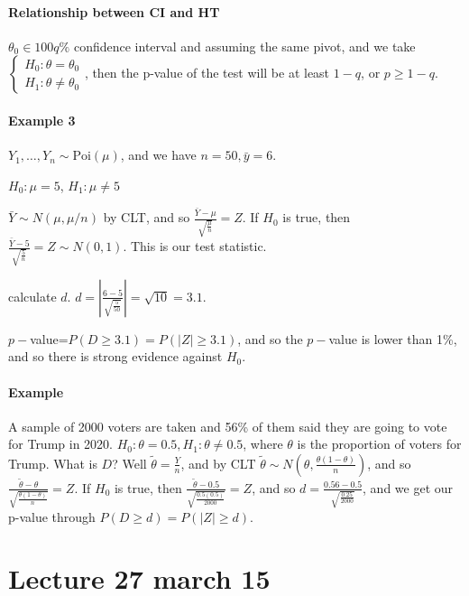 \documentclass[10pt,letter]{article}
\theoremstyle{plain}
\theoremstyle{definition}
\begin{document}
\paragraph{Relationship between CI and HT}
$\theta_0\in100q\%$ confidence interval and assuming the same pivot, and we take $\begin{cases}H_0:\theta=\theta_0\\H_1:\theta\neq\theta_0\end{cases}$, then the p-value of the test will be at least $1-q$, or $p\geq1-q$.

\paragraph{Example 3}
$Y_1,\ldots,Y_n\sim\text{Poi}(\mu)$, and we have $n=50,\bar{y}=6$. 
\begin{steps}
\item $H_0:\mu=5$, $H_1:\mu\neq5$ 
\item $\bar{Y}\sim N(\mu,\mu/n)$ by CLT, and so $\frac{\bar{Y}-\mu}{\sqrt{\frac{\mu}{n}}}=Z$. If $H_0$ is true, then $\frac{\bar{Y}-5}{\sqrt{\frac{5}{n}}}=Z\sim N(0,1)$. This is our test statistic. 
\item calculate $d$. $d=\left|\frac{6-5}{\sqrt{\frac{5}{50}}}\right|=\sqrt{10}=3.1$. 
\item $p-$value=$P(D\geq3.1)=P(|Z|\geq3.1)$, and so the $p-$value is lower than 1\%, and so there is strong evidence against $H_0$. 
\end{steps}

\paragraph{Example}
A sample of 2000 voters are taken and 56\% of them said they are going to vote for Trump in 2020. $H_0:\theta=0.5,H_1:\theta\neq0.5$, where $\theta$ is the proportion of voters for Trump. What is $D$? Well $\tilde\theta=\frac{Y}{n}$, and by CLT $\tilde\theta\sim N(\theta,\frac{\theta(1-\theta)}{n})$, and so $\frac{\tilde\theta-\theta}{\sqrt{\frac{\theta(1-\theta)}{n}}}=Z$. If $H_0$ is true, then $\frac{\tilde\theta-0.5}{\sqrt{\frac{0.5(0.5)}{2000}}}=Z$, and so $d=\frac{0.56-0.5}{\sqrt{\frac{0.25}{2000}}}$, and we get our p-value through $P(D\geq d)=P(|Z|\geq d)$. 


\section*{Lecture 27 march 15}
\end{document}
